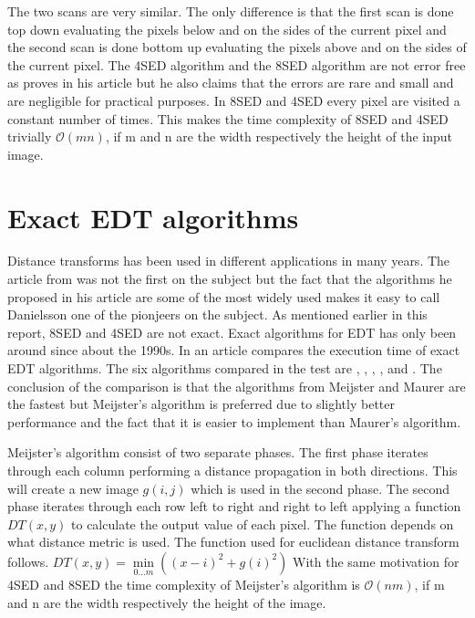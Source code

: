 The two scans are very similar. The only difference is that the first scan is done top down evaluating the pixels below and on the sides of the current pixel and the second scan is done bottom up evaluating the pixels above and on the sides of the current pixel\citep{Ragnemalm:1993}. The 4SED algorithm and the 8SED algorithm are not error free as \citet{Danielsson} proves in his article but he also claims that the errors are rare and small and are negligible for practical purposes. In 8SED and 4SED every pixel are visited a constant number of times. This makes the time complexity of 8SED and 4SED trivially $\mathcal{O}(mn)$, if m and n are the width respectively the height of the input image.
\section{Exact EDT algorithms}\label{exactEDT}
Distance transforms has been used in different applications in many years. The article from \citet{Danielsson} was not the first on the subject but the fact that the algorithms he proposed in his article are some of the most widely used\citep{edtcompare} makes it easy to call Danielsson one of the pionjeers on the subject. As mentioned earlier in this report, 8SED and 4SED are not exact. Exact algorithms for EDT has only been around since about the 1990s. In an article \citet{edtcompare} compares the execution time of exact EDT algorithms. The six algorithms compared in the test are \citet{meijster}, \citet{maurer}, \citet{eggers}, \citet{lotufo}, \citet{cuisenaire} and \citet{saito}. The conclusion of the comparison is that the algorithms from Meijster and Maurer are the fastest but Meijster's algorithm is preferred due to slightly better performance and the fact that it is easier to implement than Maurer's algorithm.

Meijster's algorithm consist of two separate phases. The first phase iterates through each column performing a distance propagation in both directions. This will create a new image \begin{math}g(i, j)\end{math} which is used in the second phase. The second phase iterates through each row left to right and right to left applying a function \begin{math}DT(x, y)\end{math} to calculate the output value of each pixel. The function depends on what distance metric is used. The function used for euclidean distance transform follows.\vspace{\baselineskip}\newline
\begin{math}
	DT(x, y) = \min\limits_{0\dots m}((x-i)^2+g(i)^2)
\end{math}\vspace{\baselineskip}\newline
With the same motivation for 4SED and 8SED the time complexity of Meijster's algorithm is $\mathcal{O}(nm)$, if m and n are the width respectively the height of the image.

